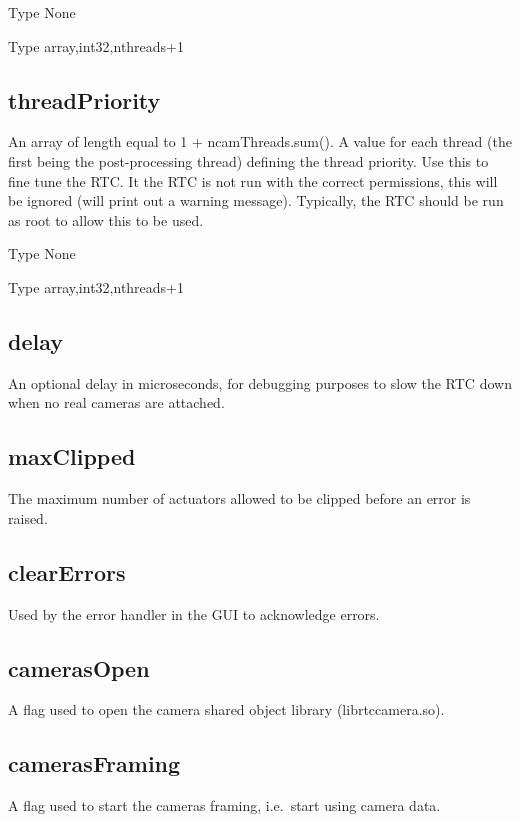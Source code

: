 \documentclass[a4,10pt]{article}
\begin{document}
Type None

Type array,int32,nthreads+1

\subsection{threadPriority}
An array of length equal to 1 + ncamThreads.sum().  A value for each
thread (the first being the post-processing thread) defining the
thread priority.  Use this to fine tune the RTC.  It the RTC is not
run with the correct permissions, this will be ignored (will print
out a warning message).  Typically, the RTC should be run as root to
allow this to be used.

Type None

Type array,int32,nthreads+1



\subsection{delay}
An optional delay in microseconds, for debugging purposes to slow the
RTC down when no real cameras are attached.

\subsection{maxClipped}
The maximum number of actuators allowed to be clipped before an error
is raised.

\subsection{clearErrors}
Used by the error handler in the GUI to acknowledge errors.

\subsection{camerasOpen}
A flag used to open the camera shared object library
(librtccamera.so).  

\subsection{camerasFraming}
A flag used to start the cameras framing, i.e.\ start using camera
data.
\end{document}
